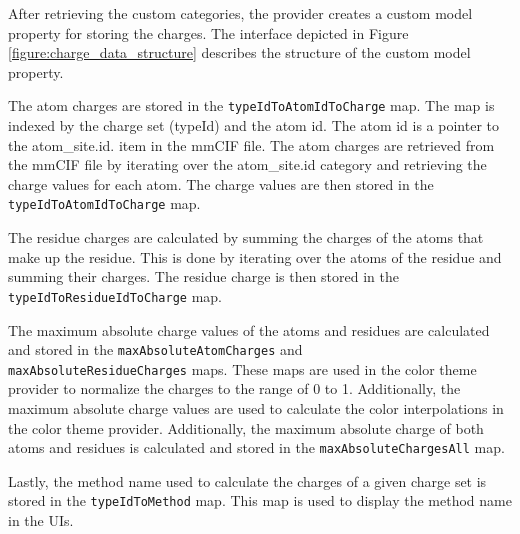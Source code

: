 \documentclass[
  digital,     %
  oneside,     %
  nosansbold,  %
  nocolorbold, %
  lof,         %
  lot,         %
]{fithesis4}
\begin{document}
After retrieving the custom categories, the provider creates a custom model property for storing the charges. The interface depicted in Figure \ref{figure:charge_data_structure} describes the structure of the custom model property.


The atom charges are stored in the \texttt{typeIdToAtomIdToCharge} map. The map is indexed by the charge set (typeId) and the atom id. The atom id is a pointer to the atom\_site.id. item in the mmCIF file. The atom charges are retrieved from the mmCIF file by iterating over the atom\_site.id category and retrieving the charge values for each atom. The charge values are then stored in the \\ \texttt{typeIdToAtomIdToCharge} map.

The residue charges are calculated by summing the charges of the atoms that make up the residue. This is done by iterating over the atoms of the residue and summing their charges. The residue charge is then stored in the \texttt{typeIdToResidueIdToCharge} map.

The maximum absolute charge values of the atoms and residues are calculated and stored in the \texttt{maxAbsoluteAtomCharges} and \\ \texttt{maxAbsoluteResidueCharges} maps. These maps are used in the color theme provider to normalize the charges to the range of 0 to 1. Additionally, the maximum absolute charge values are used to calculate the color interpolations in the color theme provider. Additionally, the maximum absolute charge of both atoms and residues is calculated and stored in the \texttt{maxAbsoluteChargesAll} map.

Lastly, the method name used to calculate the charges of a given charge set is stored in the \texttt{typeIdToMethod} map. This map is used to display the method name in the UIs.
\end{document}
